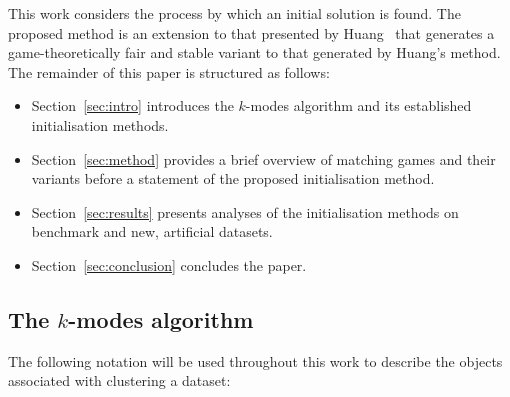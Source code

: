 This work considers the process by which an initial solution is found. The
proposed method is an extension to that presented by Huang~\cite{Huang1998} that
generates a game-theoretically fair and stable variant to that generated by
Huang's method. The remainder of this paper is structured as follows:
\begin{itemize}
    \item Section~\ref{sec:intro} introduces the \(k\)-modes algorithm and its
        established initialisation methods.
    \item Section~\ref{sec:method} provides a brief overview of
        matching games and their variants before a statement of the proposed
        initialisation method.
    \item Section~\ref{sec:results} presents analyses of the initialisation
        methods on benchmark and new, artificial datasets.
    \item Section~\ref{sec:conclusion} concludes the paper.
\end{itemize}


\subsection{The \(k\)-modes algorithm}\label{subsec:kmodes}

The following notation will be used throughout this work to describe the objects
associated with clustering a dataset:

